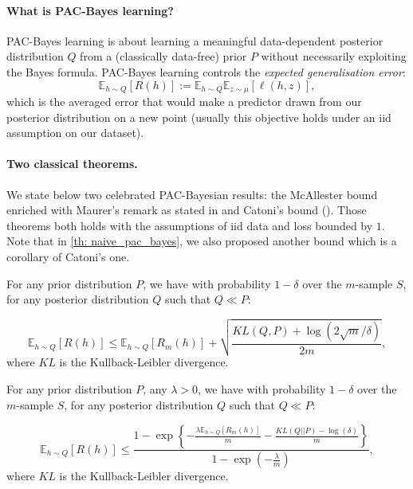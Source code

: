 \paragraph{What is PAC-Bayes learning?}
PAC-Bayes learning is about learning a meaningful data-dependent posterior distribution $Q$ from a (classically data-free) prior $P$ without necessarily exploiting the Bayes formula. PAC-Bayes learning controls the \emph{expected generalisation error}:
\[  \mathbb{E}_{h\sim Q}[R(h)] := \mathbb{E}_{h\sim Q}\mathbb{E}_{z\sim \mu} [\ell(h,z)], \]
 which is the averaged error that would make a predictor drawn from our posterior distribution on a new point (usually this objective holds under an iid assumption on our dataset).



\paragraph{Two classical theorems.} We state below two celebrated PAC-Bayesian results: the McAllester bound enriched with Maurer's remark as stated in \cite[Thm.1]{guedj2019primer} and Catoni's bound (\citealp[Thm 1.2.6]{catoni2007pac}). Those theorems both holds with the assumptions of iid data and loss bounded by $1$. Note that in \cref{th: naive_pac_bayes}, we also proposed another bound which is a corollary of Catoni's one.

\begin{theorem}
  For any prior distribution $P$, we have with probability $1-\delta$ over the $m$-sample $S$, for any posterior distribution $Q$ such that $Q\ll P$:

\[  \mathbb{E}_{h\sim Q}\left[ R(h)\right] \leq \mathbb{E}_{h\sim Q}\left[ R_m(h)\right] + \sqrt{\frac{KL(Q,P) + \log(2\sqrt{m}/\delta)}{2m}},    \]
where $KL$ is the Kullback-Leibler divergence.

\end{theorem}

\begin{theorem}
  For any prior distribution $P$, any $\lambda>0$, we have with probability $1-\delta$ over the $m$-sample $S$, for any posterior distribution $Q$ such that $Q\ll P$:

\[  \mathbb{E}_{h\sim Q}\left[ R(h)\right] \leq \frac{1-\exp \left\{-\frac{\lambda \mathbb{E}_{h\sim Q}\left[ R_m(h)\right]}{m}-\frac{KL(Q || P)-\log (\delta)}{m}\right\}}{1-\exp \left(-\frac{\lambda}{m}\right)},    \]
where $KL$ is the Kullback-Leibler divergence.

\end{theorem}






